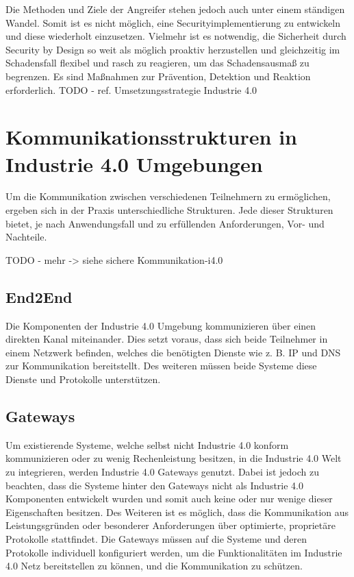 Die Methoden und Ziele der Angreifer stehen jedoch auch unter einem ständigen Wandel. Somit ist es nicht möglich, eine Securityimplementierung zu entwickeln und diese wiederholt einzusetzen. Vielmehr ist es notwendig, die Sicherheit durch Security by Design so weit als möglich proaktiv herzustellen und gleichzeitig im Schadensfall flexibel und rasch zu reagieren, um das Schadensausmaß zu begrenzen. Es sind Maßnahmen zur Prävention, Detektion und Reaktion erforderlich. TODO - ref. Umsetzungsstrategie Industrie 4.0

\section{Kommunikationsstrukturen in Industrie 4.0 Umgebungen}
Um die Kommunikation zwischen verschiedenen Teilnehmern zu ermöglichen, ergeben sich in der Praxis unterschiedliche Strukturen. Jede dieser Strukturen bietet, je nach Anwendungsfall und zu erfüllenden Anforderungen, Vor- und Nachteile.

TODO - mehr -> siehe sichere Kommunikation-i4.0

\subsection{End2End}
Die Komponenten der Industrie 4.0 Umgebung kommunizieren über einen direkten Kanal miteinander. Dies setzt voraus, dass sich beide Teilnehmer in einem Netzwerk befinden, welches die benötigten Dienste wie z. B. \ac{IP} und \ac{DNS} zur Kommunikation bereitstellt. Des weiteren müssen beide Systeme diese Dienste und Protokolle unterstützen.

\subsection{Gateways}
Um existierende Systeme, welche selbst nicht Industrie 4.0 konform kommunizieren oder zu wenig Rechenleistung besitzen, in die Industrie 4.0 Welt zu integrieren, werden Industrie 4.0 Gateways genutzt. Dabei ist jedoch zu beachten, dass die Systeme hinter den Gateways nicht als Industrie 4.0 Komponenten entwickelt wurden und somit auch keine oder nur wenige dieser Eigenschaften besitzen. Des Weiteren ist es möglich, dass die Kommunikation aus Leistungsgründen oder besonderer Anforderungen über optimierte, proprietäre Protokolle stattfindet. Die Gateways müssen auf die Systeme und deren Protokolle individuell konfiguriert werden, um die Funktionalitäten im Industrie 4.0 Netz bereitstellen zu können, und die Kommunikation zu schützen.

